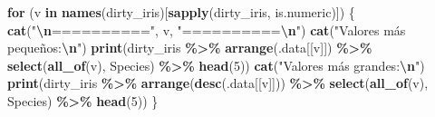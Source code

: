 \documentclass[
]{article}
\newenvironment{Shaded}{\begin{snugshade}}{\end{snugshade}}
\newcommand{\ControlFlowTok}[1]{\textcolor[rgb]{0.13,0.29,0.53}{\textbf{#1}}}
\newcommand{\DecValTok}[1]{\textcolor[rgb]{0.00,0.00,0.81}{#1}}
\newcommand{\FunctionTok}[1]{\textcolor[rgb]{0.13,0.29,0.53}{\textbf{#1}}}
\newcommand{\NormalTok}[1]{#1}
\newcommand{\SpecialCharTok}[1]{\textcolor[rgb]{0.81,0.36,0.00}{\textbf{#1}}}
\newcommand{\StringTok}[1]{\textcolor[rgb]{0.31,0.60,0.02}{#1}}
\begin{document}
\begin{Shaded}
\begin{Highlighting}[]
\ControlFlowTok{for}\NormalTok{ (v }\ControlFlowTok{in} \FunctionTok{names}\NormalTok{(dirty\_iris)[}\FunctionTok{sapply}\NormalTok{(dirty\_iris, is.numeric)]) \{}
  \FunctionTok{cat}\NormalTok{(}\StringTok{"}\SpecialCharTok{\textbackslash{}n}\StringTok{=========="}\NormalTok{, v, }\StringTok{"==========}\SpecialCharTok{\textbackslash{}n}\StringTok{"}\NormalTok{)}
  \FunctionTok{cat}\NormalTok{(}\StringTok{"Valores más pequeños:}\SpecialCharTok{\textbackslash{}n}\StringTok{"}\NormalTok{)}
  \FunctionTok{print}\NormalTok{(dirty\_iris }\SpecialCharTok{\%\textgreater{}\%} \FunctionTok{arrange}\NormalTok{(.data[[v]]) }\SpecialCharTok{\%\textgreater{}\%} \FunctionTok{select}\NormalTok{(}\FunctionTok{all\_of}\NormalTok{(v), Species) }\SpecialCharTok{\%\textgreater{}\%} \FunctionTok{head}\NormalTok{(}\DecValTok{5}\NormalTok{))}
  \FunctionTok{cat}\NormalTok{(}\StringTok{"Valores más grandes:}\SpecialCharTok{\textbackslash{}n}\StringTok{"}\NormalTok{)}
  \FunctionTok{print}\NormalTok{(dirty\_iris }\SpecialCharTok{\%\textgreater{}\%} \FunctionTok{arrange}\NormalTok{(}\FunctionTok{desc}\NormalTok{(.data[[v]])) }\SpecialCharTok{\%\textgreater{}\%} \FunctionTok{select}\NormalTok{(}\FunctionTok{all\_of}\NormalTok{(v), Species) }\SpecialCharTok{\%\textgreater{}\%} \FunctionTok{head}\NormalTok{(}\DecValTok{5}\NormalTok{))}
\NormalTok{\}}
\end{Highlighting}
\end{Shaded}
\end{document}
